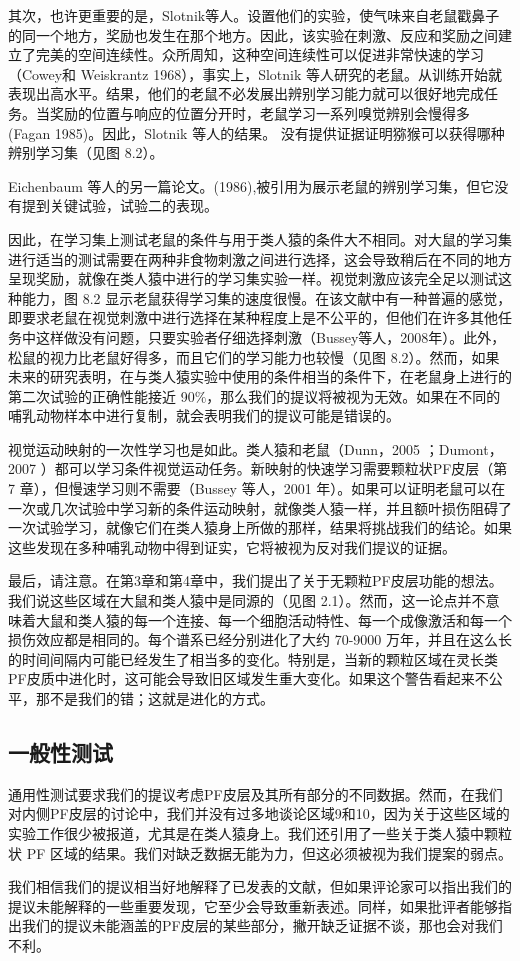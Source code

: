 \par 
其次，也许更重要的是，Slotnik等人。设置他们的实验，使气味来自老鼠戳鼻子的同一个地方，奖励也发生在那个地方。因此，该实验在刺激、反应和奖励之间建立了完美的空间连续性。众所周知，这种空间连续性可以促进非常快速的学习（Cowey和 Weiskrantz 1968），事实上，Slotnik 等人研究的老鼠。从训练开始就表现出高水平。结果，他们的老鼠不必发展出辨别学习能力就可以很好地完成任务。当奖励的位置与响应的位置分开时，老鼠学习一系列嗅觉辨别会慢得多 (Fagan 1985)。因此，Slotnik 等人的结果。 没有提供证据证明猕猴可以获得哪种辨别学习集（见图 8.2）。
\par 
Eichenbaum 等人的另一篇论文。(1986),被引用为展示老鼠的辨别学习集，但它没有提到关键试验，试验二的表现。
\par 
因此，在学习集上测试老鼠的条件与用于类人猿的条件大不相同。对大鼠的学习集进行适当的测试需要在两种非食物刺激之间进行选择，这会导致稍后在不同的地方呈现奖励，就像在类人猿中进行的学习集实验一样。视觉刺激应该完全足以测试这种能力，图 8.2 显示老鼠获得学习集的速度很慢。在该文献中有一种普遍的感觉，即要求老鼠在视觉刺激中进行选择在某种程度上是不公平的，但他们在许多其他任务中这样做没有问题，只要实验者仔细选择刺激（Bussey等人，2008年）。此外，松鼠的视力比老鼠好得多，而且它们的学习能力也较慢（见图 8.2）。然而，如果未来的研究表明，在与类人猿实验中使用的条件相当的条件下，在老鼠身上进行的第二次试验的正确性能接近 90$\%$，那么我们的提议将被视为无效。如果在不同的哺乳动物样本中进行复制，就会表明我们的提议可能是错误的。
\par 
视觉运动映射的一次性学习也是如此。类人猿和老鼠（Dunn，2005 ；Dumont，2007 ）都可以学习条件视觉运动任务。新映射的快速学习需要颗粒状PF皮层（第 7 章），但慢速学习则不需要（Bussey 等人，2001 年）。如果可以证明老鼠可以在一次或几次试验中学习新的条件运动映射，就像类人猿一样，并且额叶损伤阻碍了一次试验学习，就像它们在类人猿身上所做的那样，结果将挑战我们的结论。如果这些发现在多种哺乳动物中得到证实，它将被视为反对我们提议的证据。
\par 
最后，请注意。在第3章和第4章中，我们提出了关于无颗粒PF皮层功能的想法。我们说这些区域在大鼠和类人猿中是同源的（见图 2.1）。然而，这一论点并不意味着大鼠和类人猿的每一个连接、每一个细胞活动特性、每一个成像激活和每一个损伤效应都是相同的。每个谱系已经分别进化了大约 70-9000 万年，并且在这么长的时间间隔内可能已经发生了相当多的变化。特别是，当新的颗粒区域在灵长类PF皮质中进化时，这可能会导致旧区域发生重大变化。如果这个警告看起来不公平，那不是我们的错；这就是进化的方式。
\subsection{一般性测试}
通用性测试要求我们的提议考虑PF皮层及其所有部分的不同数据。然而，在我们对内侧PF皮层的讨论中，我们并没有过多地谈论区域9和10，因为关于这些区域的实验工作很少被报道，尤其是在类人猿身上。我们还引用了一些关于类人猿中颗粒状 PF 区域的结果。我们对缺乏数据无能为力，但这必须被视为我们提案的弱点。
\par 
我们相信我们的提议相当好地解释了已发表的文献，但如果评论家可以指出我们的提议未能解释的一些重要发现，它至少会导致重新表述。同样，如果批评者能够指出我们的提议未能涵盖的PF皮层的某些部分，撇开缺乏证据不谈，那也会对我们不利。
